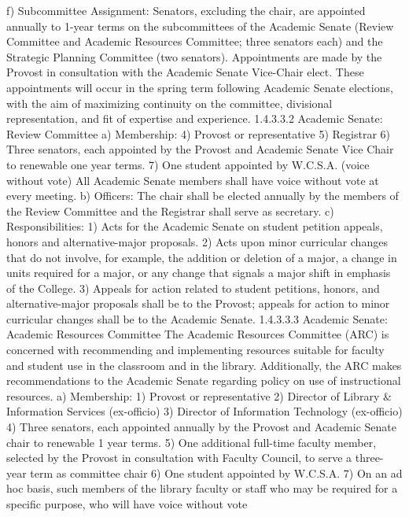 \documentclass[letterpaper, 11pt]{article}
\begin{document}
				f) Subcommittee Assignment:  Senators, excluding the chair, are appointed annually to 1-year terms on the subcommittees of the Academic Senate (Review Committee and Academic Resources Committee; three senators each) and the Strategic Planning Committee (two senators).  Appointments are made by the Provost in consultation with the Academic Senate Vice-Chair elect.  These appointments will occur in the spring term following Academic Senate elections, with the aim of maximizing continuity on the committee, divisional representation, and fit of expertise and experience.
				1.4.3.3.2 Academic Senate:  Review Committee
				a) Membership:
				4) Provost or representative
				5) Registrar
				6) Three senators, each appointed by the Provost and Academic Senate Vice Chair to renewable one year terms.
				7) One student appointed by W.C.S.A. (voice without vote)
				All Academic Senate members shall have voice without vote at every meeting.
				b) Officers:
				The chair shall be elected annually by the members of the Review Committee and the Registrar shall serve as secretary.
				c) Responsibilities:
				1) Acts for the Academic Senate on student petition appeals, honors and alternative-major proposals.
				2) Acts upon minor curricular changes that do not involve, for example, the addition or deletion of a major, a change in units required for a major, or any change that signals a major shift in emphasis of the College.
				3) Appeals for action related to student petitions, honors, and alternative-major proposals shall be to the Provost; appeals for action to minor curricular changes shall be to the Academic Senate.
				1.4.3.3.3 Academic Senate:  Academic Resources Committee
				The Academic Resources Committee (ARC) is concerned with recommending and implementing resources suitable for faculty and student use in the classroom and in the library.  Additionally, the ARC makes recommendations to the Academic Senate regarding policy on use of instructional resources.
				a) Membership:
				1) Provost or representative
				2) Director of Library \& Information Services (ex-officio)
				3) Director of Information Technology (ex-officio)
				4) Three senators, each appointed annually by the Provost and Academic Senate chair to renewable 1 year terms.
				5) One additional full-time faculty member, selected by the Provost in consultation with Faculty Council, to serve a three-year term as committee chair
				6) One student appointed by W.C.S.A.
				7) On an ad hoc basis, such members of the library faculty or staff who may be required for a specific purpose, who will have voice without vote
\end{document}
